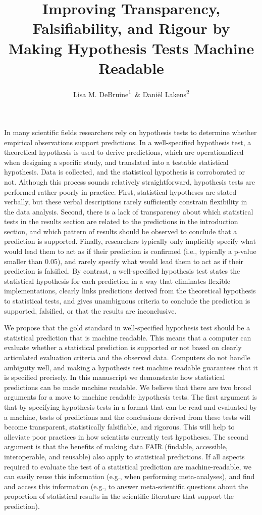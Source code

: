 \documentclass[doc,floatsintext]{apa6}
\title{Improving Transparency, Falsifiability, and Rigour by Making Hypothesis Tests Machine Readable}
\author{Lisa M. DeBruine\textsuperscript{1}~\& Daniël Lakens\textsuperscript{2}}
\date{}
\begin{document}
\maketitle

In many scientific fields researchers rely on hypothesis tests to determine whether empirical observations support predictions. In a well-specified hypothesis test, a theoretical hypothesis is used to derive predictions, which are operationalized when designing a specific study, and translated into a testable statistical hypothesis. Data is collected, and the statistical hypothesis is corroborated or not. Although this process sounds relatively straightforward, hypothesis tests are performed rather poorly in practice. First, statistical hypotheses are stated verbally, but these verbal descriptions rarely sufficiently constrain flexibility in the data analysis. Second, there is a lack of transparency about which statistical tests in the results section are related to the predictions in the introduction section, and which pattern of results should be observed to conclude that a prediction is supported. Finally, researchers typically only implicitly specify what would lead them to act as if their prediction is confirmed (i.e., typically a p-value smaller than 0.05), and rarely specify what would lead them to act as if their prediction is falsified. By contrast, a well-specified hypothesis test states the statistical hypothesis for each prediction in a way that eliminates flexible implementations, clearly links predictions derived from the theoretical hypothesis to statistical tests, and gives unambiguous criteria to conclude the prediction is supported, falsified, or that the results are inconclusive.

We propose that the gold standard in well-specified hypothesis test should be a statistical prediction that is machine readable. This means that a computer can evaluate whether a statistical prediction is supported or not based on clearly articulated evaluation criteria and the observed data. Computers do not handle ambiguity well, and making a hypothesis test machine readable guarantees that it is specified precisely. In this manuscript we demonstrate how statistical predictions can be made machine readable. We believe that there are two broad arguments for a move to machine readable hypothesis tests. The first argument is that by specifying hypothesis tests in a format that can be read and evaluated by a machine, tests of predictions and the conclusions derived from these tests will become transparent, statistically falsifiable, and rigorous. This will help to alleviate poor practices in how scientists currently test hypotheses. The second argument is that the benefits of making data FAIR (findable, accessible, interoperable, and reusable) also apply to statistical predictions. If all aspects required to evaluate the test of a statistical prediction are machine-readable, we can easily reuse this information (e.g., when performing meta-analyses), and find and access this information (e.g., to answer meta-scientific questions about the proportion of statistical results in the scientific literature that support the prediction).
\end{document}
